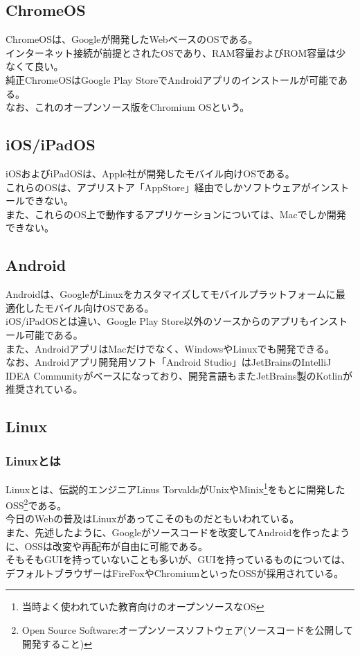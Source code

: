 \documentclass{ltjsarticle}
\begin{document}
\subsection{ChromeOS}
ChromeOSは、Googleが開発したWebベースのOSである。\\
インターネット接続が前提とされたOSであり、RAM容量およびROM容量は少なくて良い。\\
純正ChromeOSはGoogle Play StoreでAndroidアプリのインストールが可能である。\\
なお、これのオープンソース版をChromium OSという。
\subsection{iOS/iPadOS}
iOSおよびiPadOSは、Apple社が開発したモバイル向けOSである。\\
これらのOSは、アプリストア「AppStore」経由でしかソフトウェアがインストールできない。\\
また、これらのOS上で動作するアプリケーションについては、Macでしか開発できない。\\
\subsection{Android}
Androidは、GoogleがLinuxをカスタマイズしてモバイルプラットフォームに最適化したモバイル向けOSである。\\
iOS/iPadOSとは違い、Google Play Store以外のソースからのアプリもインストール可能である。\\
また、AndroidアプリはMacだけでなく、WindowsやLinuxでも開発できる。\\
なお、Androidアプリ開発用ソフト「Android Studio」はJetBrainsのIntelliJ IDEA Communityがベースになっており、開発言語もまたJetBrains製のKotlinが推奨されている。
\subsection{Linux}
\subsubsection{Linuxとは}
Linuxとは、伝説的エンジニアLinus TorvaldsがUnixやMinix\footnote[4]{当時よく使われていた教育向けのオープンソースなOS}をもとに開発したOSS\footnote[4]{Open Source Software:オープンソースソフトウェア(ソースコードを公開して開発すること)}である。\\
今日のWebの普及はLinuxがあってこそのものだともいわれている。\\
また、先述したように、Googleがソースコードを改変してAndroidを作ったように、OSSは改変や再配布が自由に可能である。\\
そもそもGUIを持っていないことも多いが、GUIを持っているものについては、デフォルトブラウザーはFireFoxやChromiumといったOSSが採用されている。
\end{document}
